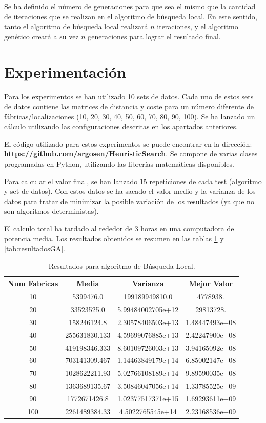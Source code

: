 \documentclass[10pt,a4paper]{article}
\begin{document}
Se ha definido el número de generaciones para que sea el mismo que la cantidad de iteraciones que se realizan en el algoritmo de búsqueda local. En este sentido, tanto el algoritmo de búsqueda local realizará $n$ iteraciones, y el algoritmo genético creará a su vez $n$ generaciones para lograr el resultado final. 

\section{Experimentación}
Para los experimentos se han utilizado 10 sets de datos. Cada uno de estos sets de datos contiene las matrices de distancia y coste para un número diferente de fábricas/localizaciones (10, 20, 30, 40, 50, 60, 70, 80, 90, 100). Se ha lanzado un cálculo utilizando las configuraciones descritas en los apartados anteriores. 

El código utilizado para estos experimentos se puede encontrar en la dirección: \textbf{https://github.com/argosen/HeuristicSearch}. Se compone de varias clases programadas en Python, utilizando las librerías matemáticas disponibles.

Para calcular el valor final, se han lanzado 15 repeticiones de cada test (algoritmo y set de datos). Con estos datos se ha sacado el valor medio y la varianza de los datos para tratar de minimizar la posible variación de los resultados (ya que no son algoritmos deterministas).

El calculo total ha tardado al rededor de 3 horas en una computadora de potencia media. Los resultados obtenidos se resumen en las tablas \ref{tab:resultadosLS} y \ref{tab:resultadosGA}.

\begin{table}
\begin{center}
\begin{tabular}{|c||c|c|c|}
\hline
Num Fabricas & Media & Varianza & Mejor Valor \\
\hline
10 & 5399476.0 & 199189949810.0 &  4778938.\\
\hline
20 & 33523525.0 & 5.99484002705e+12 &  29813728.\\
\hline
30 & 158246124.8 & 2.30578406503e+13 &   1.48447493e+08\\
\hline
40 & 255631830.133 & 4.59699076885e+13 &   2.42247900e+08\\
\hline
50 & 419198346.333 & 8.60109726003e+13 &   3.94165092e+08\\
\hline
60 & 703141309.467 & 1.14463849179e+14 &   6.85002147e+08\\
\hline
70 & 1028622211.93 & 5.02766108189e+14 &   9.89590035e+08\\
\hline
80 & 1363689135.67 & 3.50846047056e+14 &   1.33785525e+09\\
\hline
90 & 1772671426.8 & 1.02377517371e+15 &   1.69293611e+09\\
\hline
100 & 2261489384.33 & 4.5022765545e+14 &   2.23168536e+09\\
\hline
\end{tabular}
\end{center}
\caption{Resultados para algoritmo de Búsqueda Local.}
\label{tab:resultadosLS}
\end{table}
\end{document}
